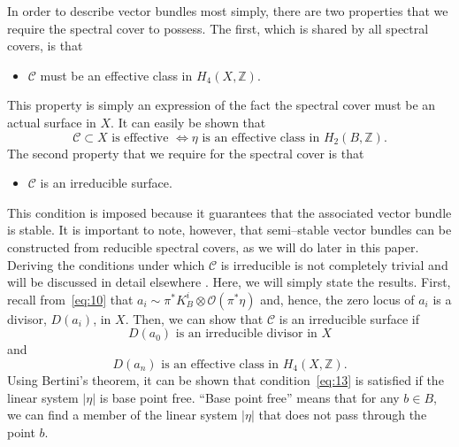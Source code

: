 \documentclass[a4paper,12pt]{article}
\numberwithin{equation}{section}
\def\cC{{\mathcal C}}
\def\cO{{\mathcal O}}
\theoremstyle{plain}
\begin{document}
In order to describe vector bundles most simply, there are two properties
that we require the spectral cover to possess. The first, which is shared by
all spectral covers, is that 
\begin{itemize}
\item $\cC$ must be an effective class in $H_{4}(X,{\mathbb Z})$.
\end{itemize}
This property is simply an expression of the fact the spectral cover must be
an actual surface in $X$. It can easily be shown that 
\begin{equation}
\cC \subset X \text{ is effective } \Longleftrightarrow \eta 
\text{ is an effective class in } H_{2}(B, {\mathbb Z}).
\label{eq:12}
\end{equation}
The second property that we require for the spectral cover is that
\begin{itemize}
\item $\cC$ is an irreducible surface.
\end{itemize}
This condition is imposed because it guarantees that the associated vector
bundle is stable. It is important to note, however, that semi--stable 
vector bundles can be constructed from reducible spectral covers, 
as we will do later in this paper. Deriving the 
conditions under which $\cC$ is irreducible is not completely trivial
and will be 
discussed in detail elsewhere \cite{mathpaper}. Here, we will 
simply state the results.
First,  recall from~\eqref{eq:10} that 
$a_{i} \sim \pi^*K_{B}^{i}\otimes 
\cO(\pi^{*}\eta)$ and, hence, the zero locus of $a_{i}$ is a divisor,
$D(a_{i})$, in $X$. Then, we can show that $\cC$ is an irreducible surface if
\begin{equation}
D(a_{0}) \text{ is an irreducible divisor in } X
\label{eq:13}
\end{equation}
and
\begin{equation}
D(a_{n}) \text{ is an effective class in } H_{4}(X, {\mathbb Z}).
\label{eq:14}
\end{equation}
Using Bertini's theorem, it can be shown that condition~\eqref{eq:13} is
satisfied if the linear system $|\eta|$ is base point free. 
``Base point free'' means that for any $b \in B$, we can find a
member of the linear system $|\eta|$  that does not pass through the point $b$. 
\end{document}
